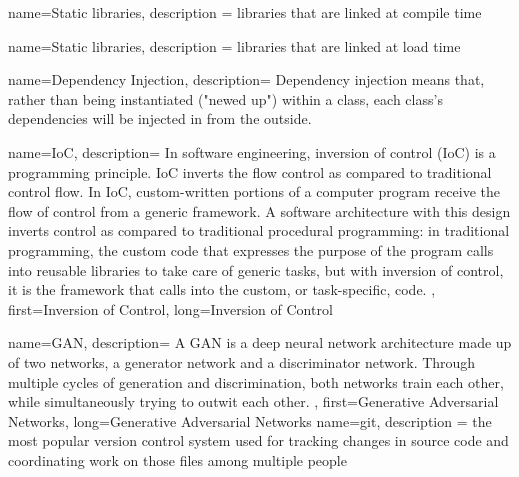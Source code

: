 
{
	name={Static libraries},
	description ={
			libraries that are linked at compile time
	}
}

{
	name={Static libraries},
	description ={
			libraries that are linked at load time
	}
}


{
	name={Dependency Injection},
	description={
		Dependency injection means that, rather than being instantiated ("newed up") within a class, each class's dependencies will be injected in from the outside.
	}
}

{
	name={IoC},
	description={
		In software engineering, inversion of control (IoC) is a programming principle. IoC inverts the flow control as compared to traditional control flow. In IoC, custom-written portions of a computer program receive the flow of control from a generic framework. A software architecture with this design inverts control as compared to traditional procedural programming: in traditional programming, the custom code that expresses the purpose of the program calls into reusable libraries to take care of generic tasks, but with inversion of control, it is the framework that calls into the custom, or task-specific, code.
	},
	first={Inversion of Control},
	long={Inversion of Control}
}

{
	name={GAN},
	description={
		A GAN is a deep neural network architecture made up of two networks, a generator network and a discriminator network. Through multiple cycles of generation and discrimination, both networks train each other, while simultaneously trying to outwit each other.
	},
	first={Generative Adversarial Networks},
	long={Generative Adversarial Networks}
}
{
	name={git},
	description ={
			the most popular version control system used for tracking changes in source code and coordinating work on those files among multiple people
	}
}

